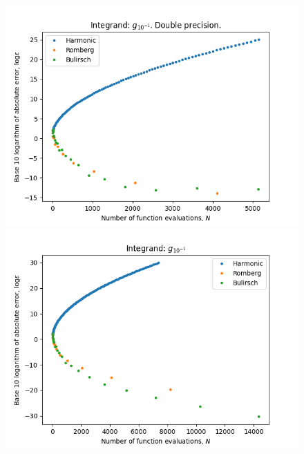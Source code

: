 \begin{figure}[H]
\centering
\begin{minipage}{0.45\textwidth}
\centering
\includegraphics[scale=0.45]{../results/romberg_plots/g_tenth.png}
\end{minipage}
\begin{minipage}{0.45\textwidth}
\centering
\includegraphics[scale=0.45]{../results/romberg_plots/g_tenth_hp.png}
\end{minipage}
\end{figure}

